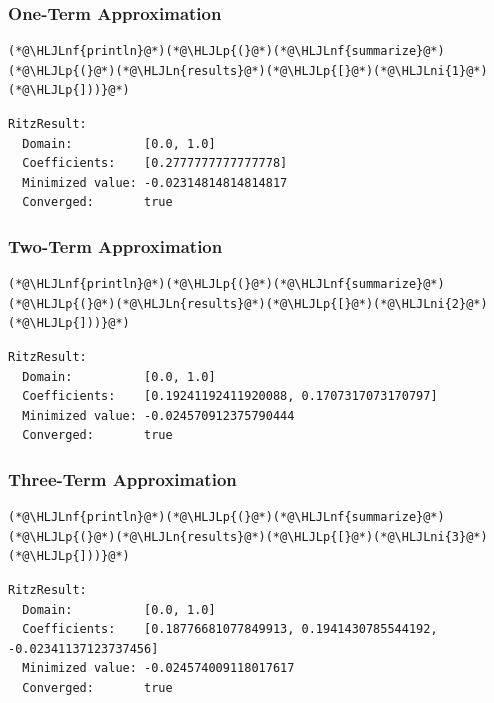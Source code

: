 \documentclass[12pt,a4paper]{article}
\newcommand{\HLJLn}[1]{#1}
\newcommand{\HLJLnf}[1]{\textcolor[RGB]{66,102,213}{#1}}
\newcommand{\HLJLni}[1]{\textcolor[RGB]{59,151,46}{#1}}
\newcommand{\HLJLp}[1]{#1}
\begin{document}
\subsubsection{One-Term Approximation}

\begin{lstlisting}
(*@\HLJLnf{println}@*)(*@\HLJLp{(}@*)(*@\HLJLnf{summarize}@*)(*@\HLJLp{(}@*)(*@\HLJLn{results}@*)(*@\HLJLp{[}@*)(*@\HLJLni{1}@*)(*@\HLJLp{]))}@*)
\end{lstlisting}

\begin{lstlisting}
RitzResult:
  Domain:          [0.0, 1.0]
  Coefficients:    [0.2777777777777778]
  Minimized value: -0.02314814814814817
  Converged:       true
\end{lstlisting}


\subsubsection{Two-Term Approximation}

\begin{lstlisting}
(*@\HLJLnf{println}@*)(*@\HLJLp{(}@*)(*@\HLJLnf{summarize}@*)(*@\HLJLp{(}@*)(*@\HLJLn{results}@*)(*@\HLJLp{[}@*)(*@\HLJLni{2}@*)(*@\HLJLp{]))}@*)
\end{lstlisting}

\begin{lstlisting}
RitzResult:
  Domain:          [0.0, 1.0]
  Coefficients:    [0.19241192411920088, 0.1707317073170797]
  Minimized value: -0.024570912375790444
  Converged:       true
\end{lstlisting}


\subsubsection{Three-Term Approximation}

\begin{lstlisting}
(*@\HLJLnf{println}@*)(*@\HLJLp{(}@*)(*@\HLJLnf{summarize}@*)(*@\HLJLp{(}@*)(*@\HLJLn{results}@*)(*@\HLJLp{[}@*)(*@\HLJLni{3}@*)(*@\HLJLp{]))}@*)
\end{lstlisting}

\begin{lstlisting}
RitzResult:
  Domain:          [0.0, 1.0]
  Coefficients:    [0.18776681077849913, 0.1941430785544192, -0.02341137123737456]
  Minimized value: -0.024574009118017617
  Converged:       true
\end{lstlisting}
\end{document}
